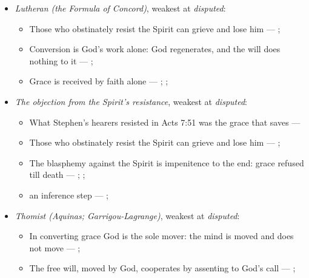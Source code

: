 \documentclass[11pt]{article}
\begin{document}
\begin{itemize}
\begin{itemize}
\end{itemize}
\item \emph{Lutheran (the Formula of Concord)}, weakest at \emph{disputed}:
\begin{itemize}
\item Those who obstinately resist the Spirit can grieve and lose him --- \cite[Solid Declaration II.83]{concordia-triglotta-1921}; \cite[Solid Declaration XI.42]{concordia-triglotta-1921}
\item Conversion is God’s work alone: God regenerates, and the will does nothing to it --- \cite[Solid Declaration II.89]{concordia-triglotta-1921}; \cite[Solid Declaration II.90]{concordia-triglotta-1921}
\item Grace is received by faith alone --- \cite[Augsburg Confession IV.1–3]{concordia-triglotta-1921}; \cite[Sermon 1, III.1]{wesley-sermons-1872}; \cite[Trent, Session VI (1547), canon 9]{tanner-decrees-1990}
\end{itemize}
\item \emph{The objection from the Spirit’s resistance}, weakest at \emph{disputed}:
\begin{itemize}
\item What Stephen’s hearers resisted in Acts 7:51 was the grace that saves --- \cite[Five Arminian Articles (1610), art. 4]{schaff-creeds-christendom-3-1977}
\item Those who obstinately resist the Spirit can grieve and lose him --- \cite[Solid Declaration II.83]{concordia-triglotta-1921}; \cite[Solid Declaration XI.42]{concordia-triglotta-1921}
\item The blasphemy against the Spirit is impenitence to the end: grace refused till death --- \cite[325]{npnf1-06-1888}; \cite[II-II q.14 a.1]{aquinas-summa-1920}; \cite[74]{calvin-harmony-evangelists-2-1845}
\item an inference step --- \cite[325]{npnf1-06-1888}; \cite[On Rebuke and Grace, ch. 43]{npnf1-05-1887}
\end{itemize}
\item \emph{Thomist (Aquinas; Garrigou-Lagrange)}, weakest at \emph{disputed}:
\begin{itemize}
\item In converting grace God is the sole mover: the mind is moved and does not move --- \cite[I-II q.111 a.2]{aquinas-summa-1920}; \cite[ch. IV]{garrigou-lagrange-grace-1952}
\item The free will, moved by God, cooperates by assenting to God’s call --- \cite[Trent, Session VI (1547), canon 4]{tanner-decrees-1990}; \cite[45]{waterworth-trent-1848}

\end{itemize}
\end{itemize}
\end{document}
